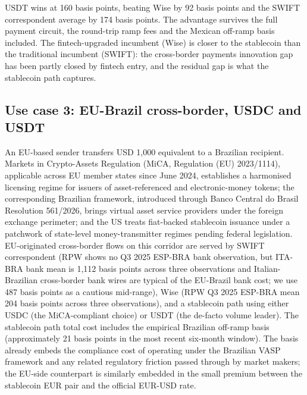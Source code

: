 USDT wins at 160 basis points, beating Wise by 92 basis points and the SWIFT correspondent average by 174 basis points. The advantage survives the full payment circuit, the round-trip ramp fees and the Mexican off-ramp basis included. The fintech-upgraded incumbent (Wise) is closer to the stablecoin than the traditional incumbent (SWIFT): the cross-border payments innovation gap has been partly closed by fintech entry, and the residual gap is what the stablecoin path captures.

\subsection{Use case 3: EU-Brazil cross-border, USDC and USDT}\label{sub:eu_br}

An EU-based sender transfers USD 1,000 equivalent to a Brazilian recipient. Markets in Crypto-Assets Regulation (MiCA, Regulation (EU) 2023/1114), applicable across EU member states since June 2024, establishes a harmonised licensing regime for issuers of asset-referenced and electronic-money tokens; the corresponding Brazilian framework, introduced through Banco Central do Brasil Resolution 561/2026, brings virtual asset service providers under the foreign exchange perimeter; and the US treats fiat-backed stablecoin issuance under a patchwork of state-level money-transmitter regimes pending federal legislation. EU-originated cross-border flows on this corridor are served by SWIFT correspondent (RPW shows no Q3 2025 ESP-BRA bank observation, but ITA-BRA bank mean is 1,112 basis points across three observations and Italian-Brazilian cross-border bank wires are typical of the EU-Brazil bank cost; we use 487 basis points as a cautious mid-range), Wise (RPW Q3 2025 ESP-BRA mean 204 basis points across three observations), and a stablecoin path using either USDC (the MiCA-compliant choice) or USDT (the de-facto volume leader). The stablecoin path total cost includes the empirical Brazilian off-ramp basis (approximately 21 basis points in the most recent six-month window). The basis already embeds the compliance cost of operating under the Brazilian VASP framework and any related regulatory friction passed through by market makers; the EU-side counterpart is similarly embedded in the small premium between the stablecoin EUR pair and the official EUR-USD rate.

